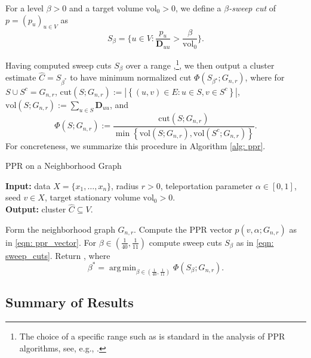 \documentclass{article}
\newcommand{\set}[1]{\left\{#1\right\}}
\newcommand{\vol}{\mathrm{vol}}
\newcommand{\cut}{\mathrm{cut}}
\newcommand{\1}{\mathbf{1}}
\newcommand{\pbf}{p}        %
\newcommand{\Xbf}{X}             %
\newcommand{\Dbf}{\mathbf{D}}
\newcommand{\Cest}{\widehat{C}}
\DeclareMathOperator*{\argmin}{arg\,min}
\theoremstyle{aldenthm}
\theoremstyle{aldenrmrk}
\begin{document}
For a level $\beta > 0$ and a target volume $\vol_0 > 0$, we define a
\emph{$\beta$-sweep cut} of $\pbf = (p_u)_{u \in V}$ as  
\begin{equation}
\label{eqn: sweep_cuts}
S_\beta = \{u \in V: \frac{p_u}{\Dbf_{uu}} > \frac{\beta}{\vol_{0}}\}.
\end{equation}

Having computed sweep cuts $S_{\beta}$ over a range ,\footnote{The choice of a specific range such as 
 is standard in the analysis of PPR
algorithms, see, e.g., \citep{zhu2013}.}, we then  output a cluster estimate $\widehat{C} = S_{\beta^*}$ to have minimum normalized cut $\Phi(S_{\beta^{\star}}; G_{n,r})$, where for $S \cup S^c = G_{n,r}$, $\cut(S;G_{n,r}) := |\set{(u,v) \in E : u \in S, v \in S^c}|$, $\vol(S; G_{n,r}) := \sum_{u \in S} \Dbf_{uu}$, and 
\begin{equation}
\label{eqn: normalized_cut}
\Phi(S; G_{n,r}) := \frac{\cut(S;G_{n,r})}{\min \set{\vol(S; G_{n,r}), \vol(S^c; G_{n,r})}}.
\end{equation}
For concreteness, we summarize this procedure in Algorithm \ref{alg: ppr}.

\begin{algorithm}
	\caption{PPR on a Neighborhood Graph}
	\label{alg: ppr}	
	{\bfseries Input:} data $\Xbf=\{x_1,\ldots,x_n\}$, radius $r > 0$, teleportation 
	parameter $\alpha \in [0,1]$, seed $v \in \Xbf$, target stationary volume $\vol_0 >
	0$. \\   
	{\bfseries Output:} cluster $\Cest \subseteq V$.
	\begin{algorithmic}[1]
		\STATE Form the neighborhood graph $G_{n,r}$.
		\STATE Compute the PPR vector $\pbf(v, \alpha; G_{n,r})$ as in \eqref{eqn:
			ppr_vector}. 
		\STATE For $\beta \in (\frac{1}{40}, \frac{1}{11})$ compute sweep cuts
		$S_{\beta}$ as in \eqref{eqn: sweep_cuts}.
		\STATE Return \smash{$\Cest = S_{\beta^*}$}, where 
		$$
		\beta^* = \argmin_{\beta \in (\frac{1}{40}, \frac{1}{11})} \Phi(S_{\beta}; G_{n,r}).
		$$
	\end{algorithmic}
\end{algorithm}

\subsection{Summary of Results}
\end{document}
